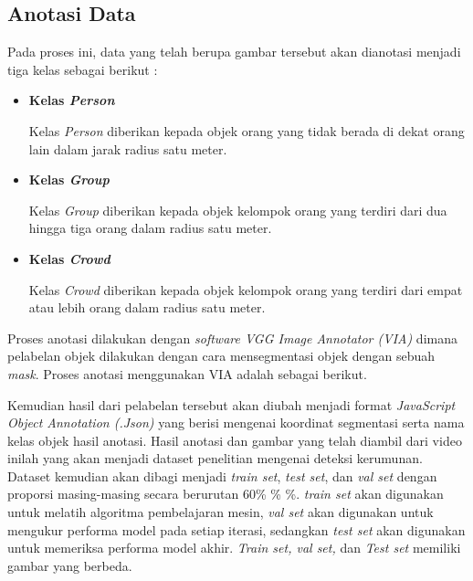   \subsection{Anotasi Data}
  Pada proses ini, data yang telah berupa gambar tersebut akan dianotasi menjadi tiga kelas sebagai berikut :
  
  \begin{itemize}
	  \item \textbf{Kelas \textit{Person}}
	  
	  Kelas \textit{Person} diberikan kepada objek orang yang tidak berada di dekat orang lain dalam jarak radius
	  satu meter.
  
	  \item \textbf{Kelas \textit{Group}}
	  
	  Kelas \textit{Group} diberikan kepada objek kelompok orang yang terdiri dari dua hingga tiga orang dalam
	  radius satu meter.
  
	  \item \textbf{Kelas \textit{Crowd}}
	  
	  Kelas \textit{Crowd} diberikan kepada objek kelompok orang yang terdiri dari empat atau lebih orang dalam
	  radius satu meter.
  \end{itemize}
  
  Proses anotasi dilakukan dengan \textit{software VGG Image Annotator (VIA)} \cite{dutta2019vgg}
  dimana pelabelan objek dilakukan dengan cara mensegmentasi objek dengan sebuah \textit{mask}. Proses anotasi menggunakan
  VIA adalah sebagai berikut.
  
  Kemudian hasil dari pelabelan tersebut akan diubah menjadi
  format \textit{JavaScript Object Annotation (.Json)} yang berisi mengenai koordinat segmentasi serta nama kelas 
  objek hasil anotasi. Hasil anotasi dan gambar yang telah diambil dari video inilah yang akan menjadi dataset
  penelitian mengenai deteksi kerumunan. Dataset kemudian akan dibagi menjadi \textit{train set}, \textit{test set},
  dan \textit{val set} dengan proporsi masing-masing secara berurutan 60\% \% \%. \textit{train set} akan
  digunakan untuk melatih algoritma pembelajaran mesin, \textit{val set} akan digunakan untuk mengukur performa model
  pada setiap iterasi, sedangkan \textit{test set} akan digunakan untuk memeriksa performa model akhir. \textit{Train set,
  val set,} dan \textit{Test set} memiliki gambar yang berbeda.
  
